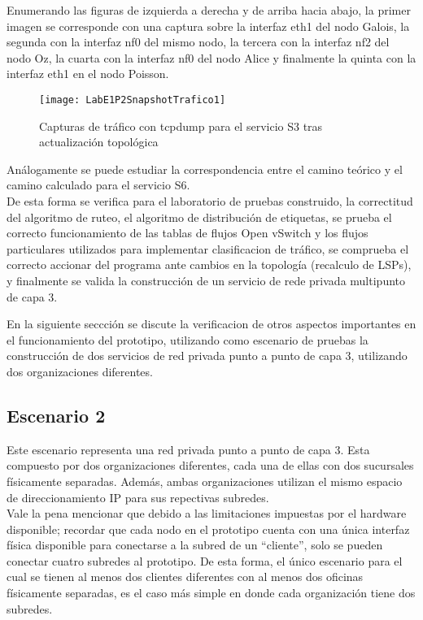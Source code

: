 Enumerando las figuras de izquierda a derecha y de arriba hacia abajo, la primer imagen se corresponde con una captura sobre la interfaz eth1 del nodo Galois, la segunda con la interfaz nf0 del mismo nodo, la tercera con la interfaz nf2 del nodo Oz, la cuarta con la interfaz nf0 del nodo Alice y finalmente la quinta con la interfaz eth1 en el nodo Poisson.

\newpage
\begin{figure}[ht!] 
\centering    
\texttt{[image: LabE1P2SnapshotTrafico1]}
\caption[Capturas de tr\'afico con tcpdump para el servicio S3 tras actualización topol\'ogica]{Capturas de tr\'afico con tcpdump para el servicio S3 tras actualización topol\'ogica}
\label{fig:LabE1P1CapsTraf3}
\end{figure}

Análogamente se puede estudiar la correspondencia entre el camino te\'orico y el camino calculado para el servicio S6.\\
 
De esta forma se verifica para el laboratorio de pruebas construido, la correctitud del algoritmo de ruteo, el algoritmo de distribución de etiquetas, se prueba el correcto funcionamiento de las tablas de flujos Open vSwitch y los flujos particulares utilizados para implementar clasificacion de tr\'afico, se comprueba el correcto accionar del programa ante cambios en la topolog\'ia (recalculo de LSPs), y finalmente se valida la construcción de un servicio de rede privada multipunto de capa 3.

En la siguiente seccci\'on se discute la verificacion de otros aspectos importantes en el funcionamiento del prototipo, utilizando como escenario de pruebas la construcci\'on de dos servicios de red privada punto a punto de capa 3, utilizando dos organizaciones diferentes.   

\subsection{Escenario 2}

Este escenario representa una red privada punto a punto de capa 3. Esta compuesto por dos organizaciones diferentes, cada una de ellas con dos sucursales f\'isicamente separadas. Adem\'as, ambas organizaciones utilizan el mismo espacio de direccionamiento IP para sus repectivas subredes.\\

Vale la pena mencionar que debido a las limitaciones impuestas por el hardware disponible; recordar que cada nodo en el prototipo cuenta con una \'unica interfaz f\'isica disponible para conectarse a la subred de un “cliente”, solo se pueden conectar cuatro subredes al prototipo. De esta forma, el \'unico  escenario para el cual se tienen al menos dos clientes diferentes con al menos dos oficinas físicamente separadas, es el caso m\'as simple en donde cada organización tiene dos subredes. 

